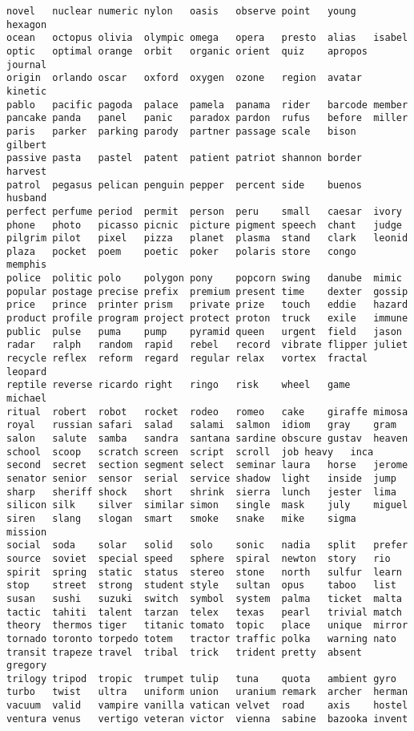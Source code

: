 \begin{verbatim}
novel	nuclear	numeric	nylon	oasis	observe	point	young	hexagon
ocean	octopus	olivia	olympic	omega	opera	presto	alias	isabel
optic	optimal	orange	orbit	organic	orient	quiz	apropos	journal
origin	orlando	oscar	oxford	oxygen	ozone	region	avatar	kinetic
pablo	pacific	pagoda	palace	pamela	panama	rider	barcode	member
pancake	panda	panel	panic	paradox	pardon	rufus	before	miller
paris	parker	parking	parody	partner	passage	scale	bison	gilbert
passive	pasta	pastel	patent	patient	patriot	shannon	border	harvest
patrol	pegasus	pelican	penguin	pepper	percent	side	buenos	husband
perfect	perfume	period	permit	person	peru	small	caesar	ivory
phone	photo	picasso	picnic	picture	pigment	speech	chant	judge
pilgrim	pilot	pixel	pizza	planet	plasma	stand	clark	leonid
plaza	pocket	poem	poetic	poker	polaris	store	congo	memphis
police	politic	polo	polygon	pony	popcorn	swing	danube	mimic
popular	postage	precise	prefix	premium	present	time	dexter	gossip
price	prince	printer	prism	private	prize	touch	eddie	hazard
product	profile	program	project	protect	proton	truck	exile	immune
public	pulse	puma	pump	pyramid	queen	urgent	field	jason
radar	ralph	random	rapid	rebel	record	vibrate	flipper	juliet
recycle	reflex	reform	regard	regular	relax	vortex	fractal	leopard
reptile	reverse	ricardo	right	ringo	risk	wheel	game	michael
ritual	robert	robot	rocket	rodeo	romeo	cake	giraffe	mimosa
royal	russian	safari	salad	salami	salmon	idiom	gray	gram
salon	salute	samba	sandra	santana	sardine	obscure	gustav	heaven
school	scoop	scratch	screen	script	scroll	job	heavy	inca
second	secret	section	segment	select	seminar	laura	horse	jerome
senator	senior	sensor	serial	service	shadow	light	inside	jump
sharp	sheriff	shock	short	shrink	sierra	lunch	jester	lima
silicon	silk	silver	similar	simon	single	mask	july	miguel
siren	slang	slogan	smart	smoke	snake	mike	sigma	mission
social	soda	solar	solid	solo	sonic	nadia	split	prefer
source	soviet	special	speed	sphere	spiral	newton	story	rio
spirit	spring	static	status	stereo	stone	north	sulfur	learn
stop	street	strong	student	style	sultan	opus	taboo	list
susan	sushi	suzuki	switch	symbol	system	palma	ticket	malta
tactic	tahiti	talent	tarzan	telex	texas	pearl	trivial	match
theory	thermos	tiger	titanic	tomato	topic	place	unique	mirror
tornado	toronto	torpedo	totem	tractor	traffic	polka	warning	nato
transit	trapeze	travel	tribal	trick	trident	pretty	absent	gregory
trilogy	tripod	tropic	trumpet	tulip	tuna	quota	ambient	gyro
turbo	twist	ultra	uniform	union	uranium	remark	archer	herman
vacuum	valid	vampire	vanilla	vatican	velvet	road	axis	hostel
ventura	venus	vertigo	veteran	victor	vienna	sabine	bazooka	invent

\end{verbatim}
